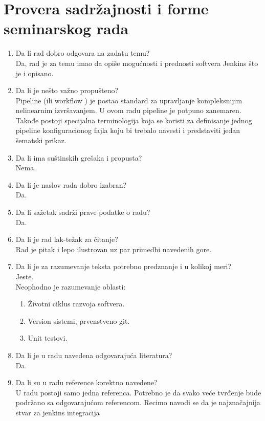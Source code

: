 \documentclass[a4paper]{article}
\begin{document}
  


\section{Provera sadržajnosti i forme seminarskog rada}

\begin{enumerate}
\item Da li rad dobro odgovara na zadatu temu?\\
  Da, rad je za temu imao da opiše mogućnosti i prednosti softvera Jenkins što je i opisano.
\item Da li je nešto važno propušteno?\\
  Pipeline (ili workflow ) je postao standard za upravljanje kompleksnijim nelinearnim
  izvršavanjem. U ovom radu pipeline je potpuno zanemaren. Takođe postoji specijalna
  terminologija koja se koristi za definisanje jednog pipeline konfiguracionog fajla koju bi trebalo
  navesti i predstaviti jedan šematski prikaz.
\item Da li ima suštinskih grešaka i propusta?\\
  Nema.
\item Da li je naslov rada dobro izabran?\\
  Da.
\item Da li sažetak sadrži prave podatke o radu?\\
  Da.
\item Da li je rad lak-težak za čitanje?\\
  Rad je pitak i lepo ilustrovan uz par primedbi navedenih gore.
\item Da li je za razumevanje teksta potrebno predznanje i u kolikoj meri?\\
  Jeste. \\
  Neophodno je razumevanje oblasti:
  \begin{enumerate}
      \item Životni ciklus razvoja softvera.
      \item Version sistemi, prvenstveno git.
      \item Unit testovi.
  \end{enumerate}
\item Da li je u radu navedena odgovarajuća literatura?\\
  Da.
\item Da li su u radu reference korektno navedene?\\
  U radu postoji samo jedna referenca. Potrebno je da svako veće tvrđenje bude podržano
  sa odgovarajućom referencom. Recimo navodi se da je najznačajnija stvar za jenkins integracija

\end{enumerate}
\end{document}
